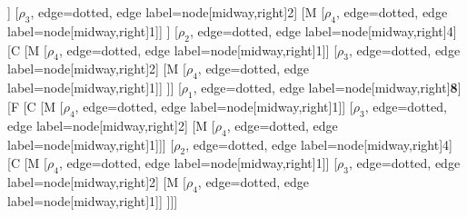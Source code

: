 \begin{forest}
[B
	[F
		[C
			[M
				[$\rho_{4}$, edge=dotted, edge label={node[midway,right]{1}}]]
			[$\rho_{3}$, edge=dotted, edge label={node[midway,right]{2}}]
			[M
				[$\rho_{4}$, edge=dotted, edge label={node[midway,right]{1}}]]
		]
		[$\rho_{2}$, edge=dotted, edge label={node[midway,right]{4}}]
		[C
			[M
				[$\rho_{4}$, edge=dotted, edge label={node[midway,right]{1}}]]
			[$\rho_{3}$, edge=dotted, edge label={node[midway,right]{2}}]
			[M
				[$\rho_{4}$, edge=dotted, edge label={node[midway,right]{1}}]]
		]]
	[$\rho_{1}$, edge=dotted, edge label={node[midway,right]{\textbf{8}}}]
	[F
		[C
			[M
				[$\rho_{4}$, edge=dotted, edge label={node[midway,right]{1}}]]
			[$\rho_{3}$, edge=dotted, edge label={node[midway,right]{2}}]
			[M
				[$\rho_{4}$, edge=dotted, edge label={node[midway,right]{1}}]]]
		[$\rho_{2}$, edge=dotted, edge label={node[midway,right]{4}}]
		[C
			[M
				[$\rho_{4}$, edge=dotted, edge label={node[midway,right]{1}}]]
			[$\rho_{3}$, edge=dotted, edge label={node[midway,right]{2}}]
			[M
				[$\rho_{4}$, edge=dotted, edge label={node[midway,right]{1}}]]
	]]]
\end{forest}
